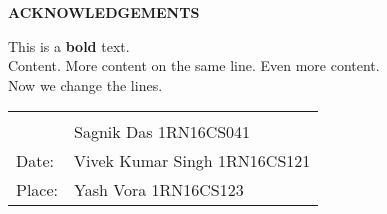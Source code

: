\thispagestyle{empty}
\begin{center}
\textup{\large{\textbf{ACKNOWLEDGEMENTS}}} \\[0.1in]
\end{center}

\justify
\indent
This is a \textbf{bold} text. \\ Content. More content on the same line. Even more content. \\ Now we change the lines. \\
\vfill

\justify
\begin{tabularx}{\linewidth}{X X}
 & {\hfill}\textup{ }\\ 
  & {\hfill}\textup{Sagnik Das 1RN16CS041}\\ 
 \textup{Date:} & {\hfill}\textup{Vivek Kumar Singh 1RN16CS121}\\
\textup{Place:} & {\hfill}\textup{Yash Vora 1RN16CS123}\\
\end{tabularx}


\pagebreak